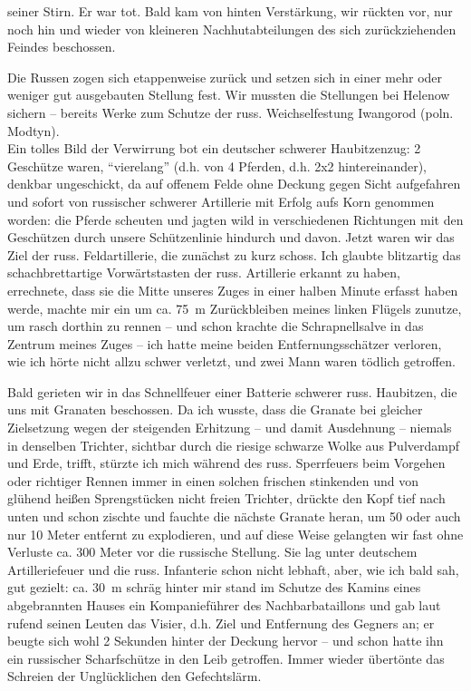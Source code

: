 \documentclass[a5paper,pagesize,10pt,twoside=true]{scrbook}
\begin{document}
seiner Stirn. Er war tot. Bald kam von hinten Verstärkung, wir rückten vor, nur noch hin und wieder von kleineren Nachhutabteilungen des sich zurückziehenden Feindes beschossen.

Die Russen zogen sich etappenweise zurück und setzen sich in einer mehr oder weniger gut ausgebauten Stellung fest. Wir mussten die Stellungen bei Helenow sichern -- bereits Werke zum Schutze der russ. Weichselfestung Iwangorod (poln. Modtyn).\\

Ein tolles Bild der Verwirrung bot ein deutscher schwerer Haubitzenzug: 2 Geschütze waren, \enquote{vierelang} (d.h. von 4 Pferden, d.h. 2x2 hintereinander), denkbar ungeschickt, da auf offenem Felde ohne Deckung gegen Sicht aufgefahren und sofort von russischer schwerer Artillerie mit Erfolg aufs Korn genommen worden: die Pferde scheuten und jagten wild in verschiedenen Richtungen mit den Geschützen durch unsere Schützenlinie hindurch und davon. Jetzt waren wir das Ziel der russ. Feldartillerie, die zunächst zu kurz schoss. Ich glaubte blitzartig das schachbrettartige Vorwärtstasten der russ. Artillerie erkannt zu haben, errechnete, dass sie die Mitte unseres Zuges in einer halben Minute erfasst haben werde, machte mir ein um ca. 75~m Zurückbleiben meines linken Flügels zunutze, um rasch dorthin zu rennen -- und schon krachte die Schrapnellsalve in das Zentrum meines Zuges -- ich hatte meine beiden Entfernungsschätzer verloren, wie ich hörte nicht allzu schwer verletzt, und zwei Mann waren tödlich getroffen.

Bald gerieten wir in das Schnellfeuer einer Batterie schwerer russ. Haubitzen, die uns mit Granaten beschossen. Da ich wusste, dass die Granate bei gleicher Zielsetzung wegen der steigenden Erhitzung -- und damit Ausdehnung -- niemals in denselben Trichter, sichtbar durch die riesige schwarze Wolke aus Pulverdampf und Erde, trifft, stürzte ich mich während des russ. Sperrfeuers beim Vorgehen oder richtiger Rennen immer in einen solchen frischen stinkenden und von glühend heißen Sprengstücken nicht freien Trichter, drückte den Kopf tief nach unten und schon zischte und fauchte die nächste Granate heran, um 50 oder auch nur 10 Meter entfernt zu explodieren, und auf diese Weise gelangten wir fast ohne Verluste ca. 300 Meter vor die russische Stellung. Sie lag unter deutschem Artilleriefeuer und die russ. Infanterie schon nicht lebhaft, aber, wie ich bald sah, gut gezielt: ca. 30~m schräg hinter mir stand im Schutze des Kamins eines abgebrannten Hauses ein Kompanieführer des Nachbarbataillons und gab laut rufend seinen Leuten das Visier, d.h. Ziel und Entfernung des Gegners an; er beugte sich wohl 2 Sekunden hinter der Deckung hervor -- und schon hatte ihn ein russischer Scharfschütze in den Leib getroffen. Immer wieder übertönte das Schreien der Unglücklichen den Gefechtslärm.
\end{document}
